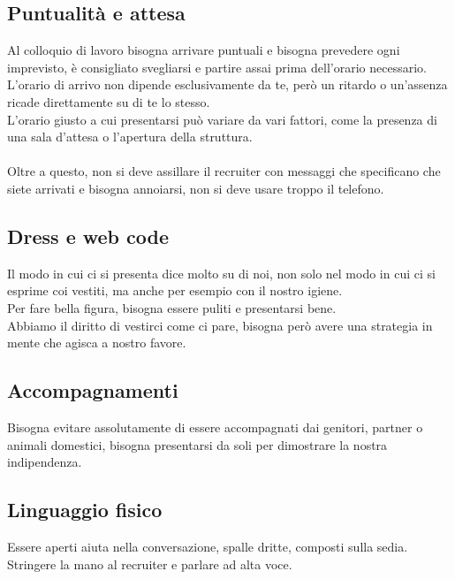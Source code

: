 \documentclass[12pt,a4paper]{article}
\begin{document}
\subsection{Puntualità e attesa}
Al colloquio di lavoro bisogna arrivare puntuali e bisogna prevedere ogni imprevisto, è consigliato svegliarsi e partire assai prima dell'orario necessario.\\
L'orario di arrivo non dipende esclusivamente da te, però un ritardo o un'assenza ricade direttamente su di te lo stesso.\\
L'orario giusto a cui presentarsi può variare da vari fattori, come la presenza di una sala d'attesa o l'apertura della struttura.\\\\
Oltre a questo, non si deve assillare il recruiter con messaggi che specificano che siete arrivati e bisogna annoiarsi, non si deve usare troppo il telefono.
\subsection{Dress e web code}
Il modo in cui ci si presenta dice molto su di noi, non solo nel modo in cui ci si esprime coi vestiti, ma anche per esempio con il nostro igiene.\\
Per fare bella figura, bisogna essere puliti e presentarsi bene.\\
Abbiamo il diritto di vestirci come ci pare, bisogna però avere una strategia in mente che agisca a nostro favore.
\subsection{Accompagnamenti}
Bisogna evitare assolutamente di essere accompagnati dai genitori, partner o animali domestici, bisogna presentarsi da soli per dimostrare la nostra indipendenza.
\subsection{Linguaggio fisico}
Essere aperti aiuta nella conversazione, spalle dritte, composti sulla sedia.\\
Stringere la mano al recruiter e parlare ad alta voce.\\
\end{document}

